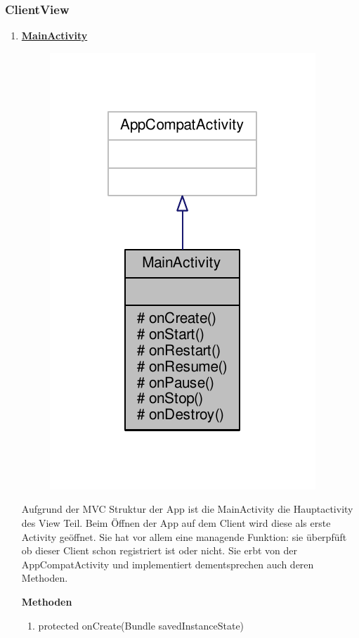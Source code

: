 \subsubsection{ClientView}
\begin{enumerate}
	\item \textbf{\underline{MainActivity}}
	
	\begin{figure}[H]
		\includegraphics[scale = 1]{res/main_activity__inherit__graph.pdf}
		\centering
	\end{figure}
	Aufgrund der MVC Struktur der App ist die MainActivity die Hauptactivity des View Teil. Beim Öffnen der App auf dem Client wird diese als erste Activity geöffnet. Sie hat vor allem eine managende Funktion: sie überpfüft ob dieser Client schon registriert ist oder nicht. Sie erbt von der AppCompatActivity und implementiert dementsprechen auch deren Methoden.
	
	\textbf{Methoden}
	\begin{enumerate}
		\item protected onCreate(Bundle savedInstanceState) 
		

\end{enumerate}
\end{enumerate}
